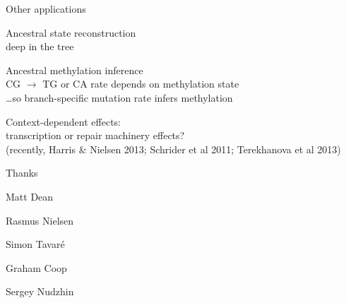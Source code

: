 \documentclass[smaller]{beamer}
\begin{document}
\begin{frame}{Other applications}

  Ancestral state reconstruction \\
  \hspace{2em} deep in the tree
    
  \vspace{3em}

  Ancestral methylation inference\\
  \hspace{2em} CG $\to$ TG or CA rate depends on methylation state \\
  \hspace{2em} \ldots so branch-specific mutation rate infers methylation
    
  \vspace{3em}

  Context-dependent effects:\\
  \hspace{2em} transcription or repair machinery effects? \\
  \hspace{2em} {\aside (recently, Harris \& Nielsen 2013; Schrider et al 2011; Terekhanova et al 2013)}

\end{frame}


\begin{frame}{Thanks}

  Matt Dean
  
  Rasmus Nielsen

  Simon Tavar\'e

  Graham Coop

  Sergey Nudzhin

\end{frame}
\end{document}
